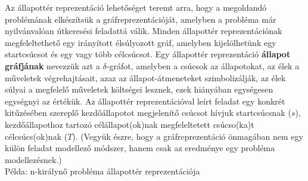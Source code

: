 \documentclass[12pt,margin=0px]{article}
\begin{document}
    {\footnotesize
    \noindent Az állapottér reprezentáció lehetőséget teremt arra, hogy a megoldandó problémának elkészítsük a gráfreprezentációját, amelyben a probléma már nyilvánvalóan útkeresési feladattá válik. Minden állapottér reprezentációnak megfeleltethető egy irányított élsúlyozott gráf, amelyben kijelölhetünk egy startcsúcsot és egy vagy több célcsúcsot. Egy állapottér reprezentáció \textbf{állapot gráfjának} nevezzük azt a $\delta$-gráfot, amelyben a csúcsok az állapotokat, az élek a műveletek végrehajtásait, azaz az állapot-átmeneteket szimbolizálják, az élek súlyai a megfelelő műveletek költségei lesznek, ezek hiányában egységesen egységnyi az értékük. Az állapottér reprezentációval leírt feladat egy konkrét kitűzésében szereplő kezdőállapotot megjelenítő csúcsot hívjuk startcsúcsnak ($s$), kezdőállapothoz tartozó célállapot(ok)nak megfeleltetett csúcso(ka)t célcsúcs(ok)nak ($T$). (Vegyük észre, hogy a gráfreprezentáció önmagában nem egy külön feladat modellező módszer, hanem csak az eredménye egy probléma modellezésnek.)
    }\\
    \newpage
    {\footnotesize\noindent Példa: n-királynő probléma állapottér reprezentációja}\\
\end{document}
